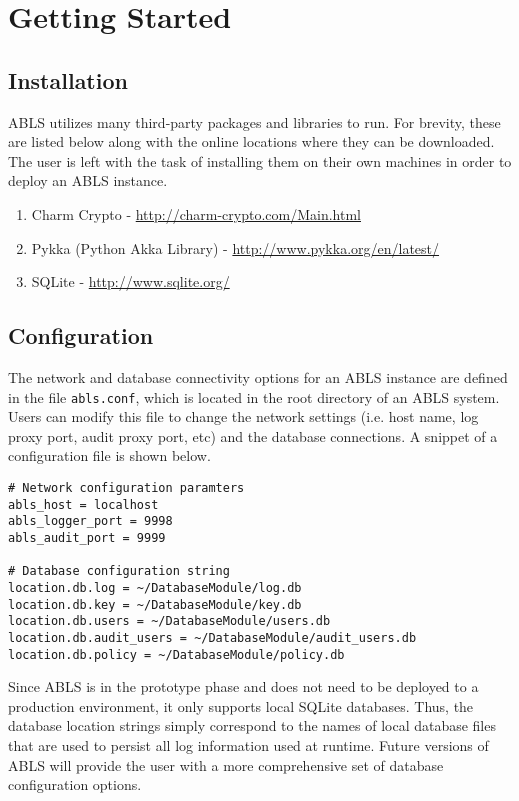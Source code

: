 \chapter{Getting Started}

\section{Installation}

ABLS utilizes many third-party packages and libraries to run. For brevity, these are listed below
along with the online locations where they can be downloaded. The user is left with the task of 
installing them on their own machines in order to deploy an ABLS instance.

\begin{enumerate}
	\item Charm Crypto - \url{http://charm-crypto.com/Main.html}
	\item Pykka (Python Akka Library) - \url{http://www.pykka.org/en/latest/}
	\item SQLite - \url{http://www.sqlite.org/}
\end{enumerate}

\section{Configuration}

The network and database connectivity options for an ABLS instance are defined in the file {\tt abls.conf}, which
is located in the root directory of an ABLS system. Users can modify this file to change the network settings (i.e. 
host name, log proxy port, audit proxy port, etc) and the database connections. A snippet of a configuration file
is shown below.

\begin{lstlisting}
# Network configuration paramters
abls_host = localhost
abls_logger_port = 9998
abls_audit_port = 9999

# Database configuration string
location.db.log = ~/DatabaseModule/log.db
location.db.key = ~/DatabaseModule/key.db
location.db.users = ~/DatabaseModule/users.db
location.db.audit_users = ~/DatabaseModule/audit_users.db
location.db.policy = ~/DatabaseModule/policy.db
\end{lstlisting}

Since ABLS is in the prototype phase and does not need to be deployed to a production environment, it only 
supports local SQLite databases. Thus, the database location strings simply correspond to the names of 
local database files that are used to persist all log information used at runtime. Future versions of ABLS will 
provide the user with a more comprehensive set of database configuration options.

